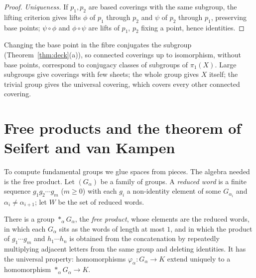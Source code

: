 \begin{proof}
\emph{Uniqueness.} If $p_1,p_2$ are based coverings with the same subgroup, the lifting criterion gives lifts $\phi$ of $p_1$ through $p_2$ and $\psi$ of $p_2$ through $p_1$, preserving base points;
$\psi\circ\phi$ and $\phi\circ\psi$ are lifts of $p_1$, $p_2$ fixing a point, hence identities.
\end{proof}

Changing the base point in the fibre conjugates the subgroup (Theorem~\ref{thm:deck}(a)), so connected coverings up to isomorphism, without base points, correspond to conjugacy classes of
subgroups of $\pi_1(X)$. Large subgroups give coverings with few sheets; the whole group gives $X$ itself; the trivial group gives the universal covering, which covers every other
connected covering.

\section{Free products and the theorem of Seifert and van Kampen}

To compute fundamental groups we glue spaces from pieces. The algebra needed is the free product. Let $(G_\alpha)$ be a family of groups. A \emph{reduced word} is a finite
sequence $g_1g_2\cdots g_m$ ($m\ge0$) with each $g_i$ a non-identity element of some $G_{\alpha_i}$ and $\alpha_i\ne\alpha_{i+1}$; let $W$ be the set of reduced words.

\begin{proposition}\label{prop:freeproduct}
There is a group $\mathop{\ast}_\alpha G_\alpha$, the \emph{free product}, whose elements are the reduced words, in which each $G_\alpha$ sits as the words of length at most $1$, and in which the
product of $g_1\cdots g_m$ and $h_1\cdots h_n$ is obtained from the concatenation by repeatedly multiplying adjacent letters from the same group and deleting identities. It has the
universal property: homomorphisms $\varphi_\alpha\colon G_\alpha\to K$ extend uniquely to a homomorphism $\mathop{\ast}_\alpha G_\alpha\to K$.
\end{proposition}

